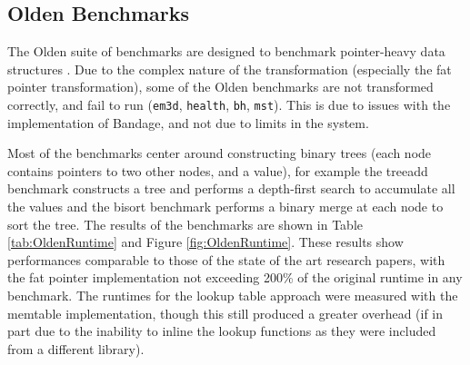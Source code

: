 \subsection{Olden Benchmarks}

The Olden suite of benchmarks are designed to benchmark pointer-heavy data structures \cite{olden}.
Due to the complex nature of the transformation (especially the fat pointer transformation), some of the Olden benchmarks are not transformed correctly, and fail to run (\verb!em3d!, \verb!health!, \verb!bh!, \verb!mst!).
This is due to issues with the implementation of Bandage, and not due to limits in the system.

Most of the benchmarks center around constructing binary trees (each node contains pointers to two other nodes, and a value), for example the treeadd benchmark constructs a tree and performs a depth-first search to accumulate all the values and the bisort benchmark performs a binary merge at each node to sort the tree.
The results of the benchmarks are shown in Table \ref{tab:OldenRuntime} and Figure \ref{fig:OldenRuntime}.
These results show performances comparable to those of the state of the art research papers, with the fat pointer implementation not exceeding 200\% of the original runtime in any benchmark.
The runtimes for the lookup table approach were measured with the memtable implementation, though this still produced a greater overhead (if in part due to the inability to inline the lookup functions as they were included from a different library).

